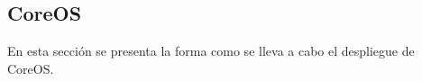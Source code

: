 \subsection{\label{sec:despliegue-coreos}CoreOS}
En esta sección se presenta la forma como se lleva a cabo el despliegue de CoreOS.

